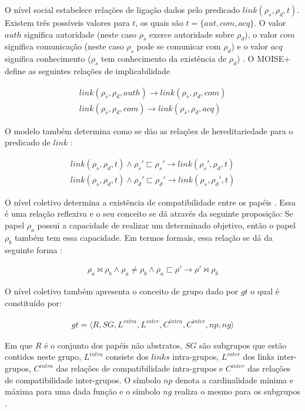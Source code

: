 O nível social estabelece relações de ligação dados pelo predicado $link(\rho_s,\rho_d,t)$. Existem três possíveis valores para $t$, os quais são $t = \{aut, com, acq\}$. O valor $auth$ significa autoridade (neste caso $\rho_s$ exerce autoridade sobre $\rho_d$), o valor $com$ significa comunicação (neste caso $\rho_s$ pode se comunicar com $\rho_d$) e o valor $acq$ significa conhecimento ($\rho_s$ tem conhecimento da existência de $\rho_d$) \cite{moiseframework,dynamicagenttemporalstruct}. O MOISE+ define as seguintes relações de implicabilidade

\begin{eqnarray}\nonumber
	link(\rho_s,\rho_d,auth) \to link(\rho_s,\rho_d,com) \nonumber \\
	link(\rho_s,\rho_d,com) \to link(\rho_s,\rho_d,acq) 
\end{eqnarray}

O modelo também determina como se dão as relações de hereditariedade para o predicado de $link$ \cite{moiseframework,dynamicagenttemporalstruct}: 

\begin{eqnarray}\nonumber
	link(\rho_s,\rho_d,t) \wedge \rho_s' \sqsubset \rho_s' \to link(\rho_s',\rho_d,t) \nonumber \\
	link(\rho_s,\rho_d,t) \wedge \rho_d' \sqsubset \rho_d' \to link(\rho_s,\rho_d',t) 	
\end{eqnarray}


O nível coletivo determina a existência de compatibilidade entre os papéis \cite{moiseframework}. Essa é uma relação reflexiva e o seu conceito se dá através da seguinte proposição: Se papel $\rho_a$ possui a capacidade de realizar um determinado objetivo, então o papel $\rho_b$ também tem essa capacidade. Em termos formais, essa relação se dá da seguinte forma \cite{moiseframework,deonticOne}:

\begin{eqnarray}
	\rho_a \bowtie \rho_b \wedge \rho_a \neq \rho_b \wedge \rho_a \sqsubset \rho' \to \rho' \bowtie \rho_b 
\end{eqnarray}

O nível coletivo também apresenta o conceito de grupo dado por $gt$ o qual é constituído por:

\begin{eqnarray}
	gt = \langle R,SG,L^{intra},L^{inter},C^{intra},C^{inter},np,ng\rangle 
\end{eqnarray}

Em que $R$ é o conjunto dos papéis não abstratos, $SG$ são subgrupos que estão contidos neste grupo, $L^{intra}$ consiste dos $links$ intra-grupos, $L^{inter}$ dos links inter-grupos, 
$C^{intra}$ das relações de compatibilidade intra-grupos e $C^{inter}$ das relações de compatibilidade inter-grupos. O símbolo $np$ denota a cardinalidade mínima e máxima para uma dada 
função e o símbolo $ng$ realiza o mesmo para os subgrupos \cite{moiseframework}. 

